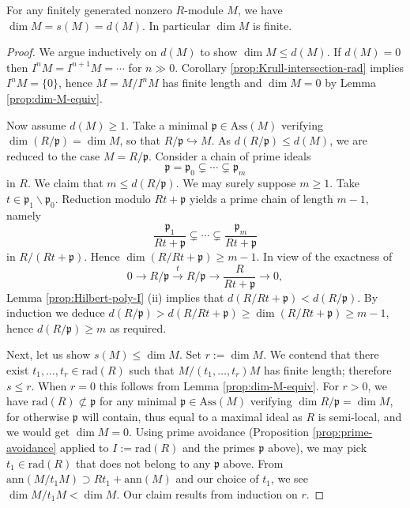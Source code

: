 \begin{theorem}\label{prop:dim-s-d}
	For any finitely generated nonzero $R$-module $M$, we have $\dim M = s(M) = d(M)$. In particular $\dim M$ is finite.
\end{theorem}
\begin{proof}
	We argue inductively on $d(M)$ to show $\dim M \leq d(M)$. If $d(M)=0$ then $I^n M = I^{n+1} M = \cdots$ for $n \gg 0$. Corollary \ref{prop:Krull-intersection-rad} implies $I^n M = \{0\}$, hence $M=M/I^n M$ has finite length and $\dim M = 0$ by Lemma \ref{prop:dim-M-equiv}.
	
	Now assume $d(M) \geq 1$. Take a minimal $\mathfrak{p} \in \text{Ass}(M)$ verifying $\dim(R/\mathfrak{p}) = \dim M$, so that $R/\mathfrak{p} \hookrightarrow M$. As $d(R/\mathfrak{p}) \leq d(M)$, we are reduced to the case $M = R/\mathfrak{p}$. Consider a chain of prime ideals
	\[ \mathfrak{p} = \mathfrak{p}_0 \subsetneq \cdots \subsetneq \mathfrak{p}_m \]
	in $R$. We claim that $m \leq d(R/\mathfrak{p})$. We may surely suppose $m \geq 1$. Take $t \in \mathfrak{p}_1 \smallsetminus \mathfrak{p}_0$. Reduction modulo $Rt + \mathfrak{p}$ yields a prime chain of length $m-1$, namely
	\[ \frac{\mathfrak{p}_1}{Rt + \mathfrak{p}} \subsetneq \cdots \subsetneq \frac{\mathfrak{p}_m}{Rt + \mathfrak{p}} \]
	in $R/(Rt + \mathfrak{p})$. Hence $\dim(R/Rt+\mathfrak{p}) \geq m-1$. In view of the exactness of
	\[ 0 \to R/\mathfrak{p} \xrightarrow{t} R/\mathfrak{p} \to \frac{R}{Rt+\mathfrak{p}} \to 0, \]
	Lemma \ref{prop:Hilbert-poly-I} (ii) implies that $d(R/Rt+\mathfrak{p}) < d(R/\mathfrak{p})$. By induction we deduce $d(R/\mathfrak{p}) > d(R/Rt+\mathfrak{p}) \geq \dim(R/Rt+\mathfrak{p}) \geq m-1$, hence $d(R/\mathfrak{p}) \geq m$ as required.
	
	Next, let us show $s(M) \leq \dim M$. Set $r := \dim M$. We contend that there exist $t_1, \ldots, t_r \in \text{rad}(R)$ such that $M/(t_1, \ldots, t_r)M$ has finite length; therefore $s \leq r$. When $r=0$ this follows from Lemma \ref{prop:dim-M-equiv}. For $r > 0$, we have $\text{rad}(R) \not\subset \mathfrak{p}$ for any minimal $\mathfrak{p} \in \text{Ass}(M)$ verifying $\dim R/\mathfrak{p} = \dim M$, for otherwise $\mathfrak{p}$ will contain, thus equal to a maximal ideal as $R$ is semi-local, and we would get $\dim M = 0$. Using prime avoidance (Proposition \ref{prop:prime-avoidance} applied to $I := \text{rad}(R)$ and the primes $\mathfrak{p}$ above), we may pick $t_1 \in \text{rad}(R)$ that does not belong to any $\mathfrak{p}$ above. From $\text{ann}(M/t_1 M) \supset Rt_1 + \text{ann}(M)$ and our choice of $t_1$, we see $\dim M/t_1 M < \dim M$. Our claim results from induction on $r$.
	

\end{proof}
